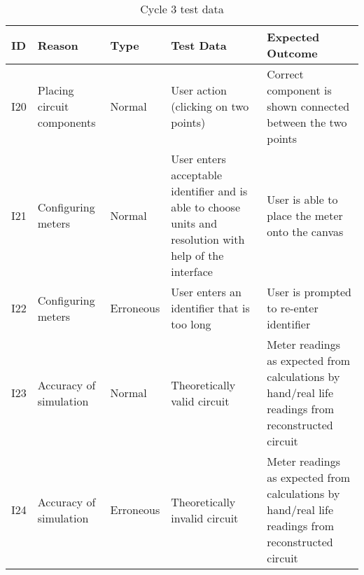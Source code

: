 \begin{table}[!h]
    \centering
    \begin{tabular}{@{}lp{75pt}lp{125pt}p{135pt}@{}} \toprule
        \textbf{ID} & \textbf{Reason} & \textbf{Type} & \textbf{Test Data} & \textbf{Expected Outcome} \\ \midrule 
        I20 & Placing circuit components & Normal & User action (clicking on two points) & Correct component is shown connected between the two points \\ 
        I21 & Configuring meters & Normal & User enters acceptable identifier and is able to choose units and resolution with help of the interface & User is able to place the meter onto the canvas \\ 
        I22 & Configuring meters & Erroneous & User enters an identifier that is too long & User is prompted to re-enter identifier \\ 
        I23 & Accuracy of simulation & Normal & Theoretically valid circuit & Meter readings as expected from calculations by hand/real life readings from reconstructed circuit \\ 
        I24 & Accuracy of simulation & Erroneous & Theoretically invalid circuit & Meter readings as expected from calculations by hand/real life readings from reconstructed circuit \\ 
        \bottomrule
    \end{tabular}
    \caption{Cycle 3 test data}
    \label{tbl:test-data-cycle3}
\end{table}